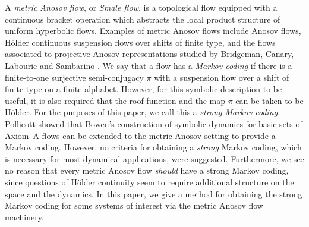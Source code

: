 \documentclass[JEP,XML,SOM,Unicode,NoFloatCountersInSection]{cedram}
\theoremstyle{definition}
\numberwithin{equation}{section}
\begin{document}
A \emph{metric Anosov flow}, or \emph{Smale flow}, is a topological flow equipped with a continuous bracket operation which abstracts the local product structure of uniform hyperbolic flows. Examples of metric Anosov flows include Anosov flows, Hölder continuous suspension flows over shifts of finite type, and the flows associated to projective Anosov representations studied by Bridgeman, Canary, Labourie and Sambarino \cite{bcls, BC17}. We say that a flow has a \emph{Markov coding} if there is a finite-to-one surjective semi-conjugacy $\pi$ with a suspension flow over a shift of finite type on a finite alphabet. However, for this symbolic description to be useful, it is also required that the roof function and the map $\pi$ can be taken to be Hölder. For the purposes of this paper, we call this a \emph{strong Markov coding}. Pollicott showed that Bowen's construction of symbolic dynamics for basic sets of Axiom~A flows can be extended to the metric Anosov setting \cite{pollicott} to provide a Markov coding. However, no criteria for obtaining a \emph{strong} Markov coding, which is necessary for most dynamical applications, were suggested. Furthermore, we see no reason that every metric Anosov flow \emph{should} have a strong Markov coding, since questions of Hölder continuity seem to require additional structure on the space and the dynamics. In this paper, we give a method for obtaining the strong Markov coding for some systems of interest via the metric Anosov flow machinery.
\end{document}
